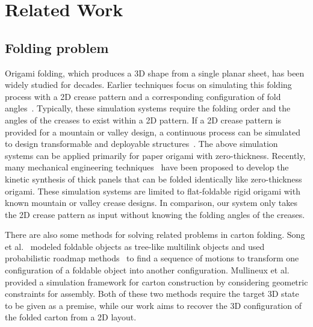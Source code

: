 \section{Related Work}\label{sec:relatedwork}
\subsection{Folding problem}

Origami folding, which produces a 3D shape from a single planar sheet, has been widely studied for decades. Earlier techniques focus on simulating this folding process with a 2D crease pattern and a corresponding configuration of fold angles~\cite{Thiel1998,Kishi:1998:OFP:786112.786279,Nimnual2007Virtual}. Typically, these simulation systems require the folding order and the angles of the creases to exist within a 2D pattern. 
%
If a 2D crease pattern is provided for a mountain or valley design, a continuous process can be simulated to design transformable and deployable structures~\cite{tachi2009simulation,tachigeometric}.
%
The above simulation systems can be applied primarily for paper origami with zero-thickness. Recently, many mechanical engineering techniques~\cite{tachi2011rigid,chen2015origami,2016arXiv160105747K} have been proposed to develop the kinetic synthesis of thick panels that can be folded identically like zero-thickness origami.
%
These simulation systems are limited to flat-foldable rigid origami with known mountain or valley crease designs. In comparison, our system only takes the 2D crease pattern as input without knowing the folding angles of the creases. 

 
There are also some methods for solving related problems in carton folding. 
Song et al.~\cite{Song:2000:MPA:892954} modeled foldable objects as tree-like multilink objects and used probabilistic roadmap methods~\cite{Kavraki:1994:PRP:891758} to find a sequence of motions to transform one configuration of a foldable object into another configuration. 
Mullineux et al.~\cite{Mullineux:2010:CSC:1739328.1739673} provided a simulation framework for carton construction by considering geometric constraints for assembly.
Both of these two methods require the target 3D state to be given as a premise, while our work aims to recover the 3D configuration of the folded carton from a 2D layout.

